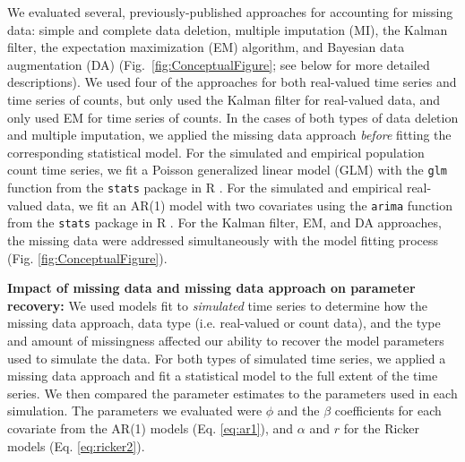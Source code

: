 \documentclass{article}
\begin{document}
We evaluated several, previously-published approaches for accounting for missing data: simple and complete data deletion, multiple imputation (MI), the Kalman filter, the expectation maximization (EM) algorithm, and Bayesian data augmentation (DA) (Fig.\ \ref{fig:ConceptualFigure}; see below for more detailed descriptions). We used four of the approaches for both real-valued time series and time series of counts, but only used the Kalman filter for real-valued data, and only used EM for time series of counts. %
In the cases of both types of data deletion and multiple imputation, we applied the missing data approach \textit{before} fitting the corresponding statistical model. For the simulated and empirical population count time series, we fit a Poisson generalized linear model (GLM) with the \texttt{glm} function from the \texttt{stats} package in R \citep{r_2021}. For the simulated and empirical real-valued data, we fit an AR(1) model with two covariates using the \texttt{arima} function from the \texttt{stats} package in R \citep{r_2021}. For the Kalman filter, EM, and DA approaches, the missing data were addressed simultaneously with the model fitting process (Fig. \ref{fig:ConceptualFigure}). 

\noindent\textbf{Impact of missing data and missing data approach on parameter recovery:} We used models fit to \textit{simulated} time series to determine how the missing data approach, data type (i.e. real-valued or count data), and the type and amount of missingness affected our ability to recover the model parameters used to simulate the data. For both types of simulated time series, we applied a missing data approach and fit a statistical model to the full extent of the time series. We then compared the parameter estimates to the parameters used in each simulation. The parameters we evaluated were $\phi$ and the $\beta$ coefficients for each covariate from the AR(1) models (Eq. \ref{eq:ar1}), and $\alpha$ and $r$ for the Ricker models (Eq. \ref{eq:ricker2}).
\end{document}
